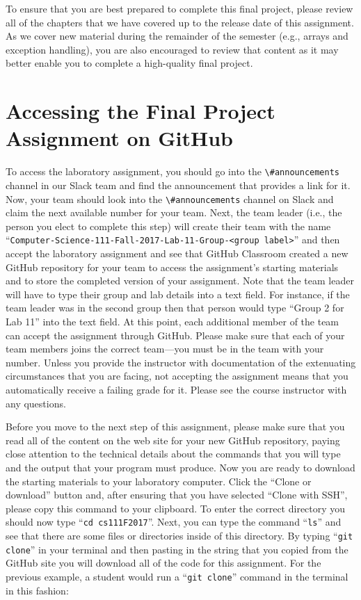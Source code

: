 \documentclass[11pt]{article}
\newcommand{\command}[1]{``\lstinline{#1}''}
\newcommand{\channel}[1]{\lstinline{#1}}
\begin{document}
To ensure that you are best prepared to complete this final project, please review all of the chapters that we have
covered up to the release date of this assignment. As we cover new material during the remainder of the semester (e.g.,
arrays and exception handling), you are also encouraged to review that content as it may better enable you to complete a
high-quality final project.

\section*{Accessing the Final Project Assignment on GitHub}

To access the laboratory assignment, you should go into the \channel{\#announcements} channel in our Slack team and find
the announcement that provides a link for it. Now, your team should look into the \channel{\#announcements} channel on
Slack and claim the next available number for your team. Next, the team leader (i.e., the person you elect to complete
this step) will create their team with the name \command{Computer-Science-111-Fall-2017-Lab-11-Group-<group label>} and
then accept the laboratory assignment and see that GitHub Classroom created a new GitHub repository for your team to
access the assignment's starting materials and to store the completed version of your assignment. Note that the team
leader will have to type their group and lab details into a text field. For instance, if the team leader was in the
second group then that person would type ``Group 2 for Lab 11'' into the text field. At this point, each additional
member of the team can accept the assignment through GitHub. Please make sure that each of your team members joins the
correct team---you must be in the team with your number. Unless you provide the instructor with documentation of the
extenuating circumstances that you are facing, not accepting the assignment means that you automatically receive a
failing grade for it. Please see the course instructor with any questions.

Before you move to the next step of this assignment, please make sure that you read all of the content on the web site
for your new GitHub repository, paying close attention to the technical details about the commands that you will type
and the output that your program must produce. Now you are ready to download the starting materials to your laboratory
computer. Click the ``Clone or download'' button and, after ensuring that you have selected ``Clone with SSH'', please
copy this command to your clipboard. To enter the correct directory you should now type \command{cd cs111F2017}. Next,
you can type the command \command{ls} and see that there are some files or directories inside of this directory. By
typing \command{git clone} in your terminal and then pasting in the string that you copied from the GitHub site you will
download all of the code for this assignment. For the previous example, a student would run a \command{git clone}
command in the terminal in this fashion:
\end{document}
